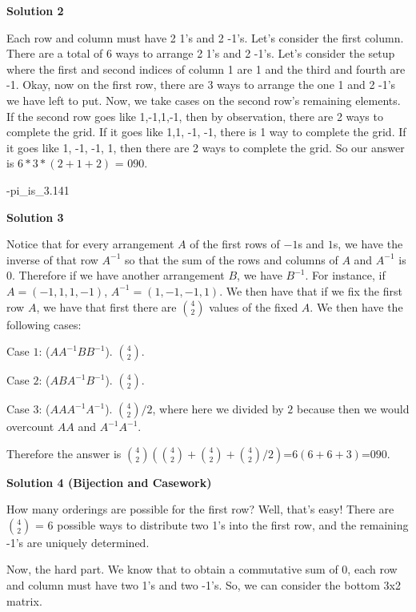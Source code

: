 \begin{enumerate}
 



\textbf{Solution 2}

Each row and column must have 2 1's and 2 -1's. Let's consider the first column. There are a total of $6$ ways to arrange 2 1's and 2 -1's. Let's consider the setup where the first and second indices of column 1 are 1 and the third and fourth are -1. Okay, now on the first row, there are 3 ways to arrange the one 1 and 2 -1's we have left to put. Now, we take cases on the second row's remaining elements. If the second row goes like 1,-1,1,-1, then by observation, there are 2 ways to complete the grid. If it goes like 1,1, -1, -1, there is 1 way to complete the grid. If it goes like 1, -1, -1, 1, then there are 2 ways to complete the grid. So our answer is $6*3*(2+1+2)$ = $\boxed{090}$.

 -pi\_is\_3.141

 



\textbf{Solution 3}

Notice that for every arrangement $A$ of the first rows of $-1$s and $1$s, we have the inverse of that row $A^{-1}$ so that the sum of the rows and columns of $A$ and $A^{-1}$ is $0$. Therefore if we have another arrangement $B$, we have $B^{-1}$. For instance, if $A=(-1,1,1,-1)$, $A^{-1}=(1,-1,-1,1)$. We then have that if we fix the first row $A$, we have that first there are $\binom{4}{2}$ values of the fixed $A$. We then have the following cases:

 Case $1$: ($AA^{-1}BB^{-1}$). $\binom{4}{2}$.

 Case $2$: ($ABA^{-1}B^{-1}$). $\binom{4}{2}$.

 Case $3$: ($AAA^{-1}A^{-1}$). $\binom{4}{2}/2$, where here we divided by $2$ because then we would overcount $AA$ and $A^{-1}A^{-1}$.

 Therefore the answer is $\binom{4}{2}(\binom{4}{2}+\binom{4}{2}+\binom{4}{2}/2)$=$6(6+6+3)$=$\boxed{090}$.

 



\textbf{Solution 4 (Bijection and Casework)}

How many orderings are possible for the first row? Well, that's easy! There are \( 4 \choose 2 \) = 6 possible ways to distribute two 1's into the first row, and the remaining -1's are uniquely determined.

 Now, the hard part. We know that to obtain a commutative sum of 0, each row and column must have two 1's and two -1's. So, we can consider the bottom 3x2 matrix.


\end{enumerate}
